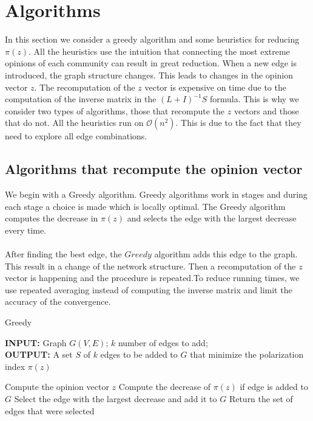 \chapter{Algorithms}
\label{ch:algorithms}


In this section we  consider a greedy algorithm and some heuristics for reducing $\pi(z)$. All the heuristics use the intuition that connecting the most extreme opinions of each community can result in great reduction. 
When a new edge is introduced, the graph structure changes. This leads to changes in the opinion vector $z$.
The recomputation of the $z$ vector is expensive on time due to the computation of the inverse matrix in the $(L+I)^{-1}S$ formula.
This is why we consider two types of algorithms, those that recompute the $z$ vectors and those that do not.
All the heuristics run on $\mathcal{O}(n^2)$. This is due to the fact that they need to explore all edge combinations.

\section{Algorithms that recompute the opinion vector}
\label{sec:recomputeAlgos}

We begin with a Greedy algorithm. Greedy algorithms work in stages and during each stage a choice is made which is locally optimal.
The Greedy algorithm computes the decrease in $\pi(z)$ and selects the edge with the largest decrease every time.
\\
\\
After finding the best edge, the $Greedy$ algorithm adds this edge to the graph. This result in a change of the network structure.
Then a recomputation of the $z$ vector is happening and  the procedure is repeated.To reduce running times, we  use repeated averaging instead of computing the inverse matrix and limit the accuracy of the convergence.

\vspace{30pt}
    		\begin{algorithm}[H]
		
			\caption{Greedy}
			\label{alg:greedyAlgo}
			
			\begin{flushleft}
        				\textbf{INPUT:} Graph $G(V, E)$; $k$ number of edges to add;
				\vspace{6pt} \\
        				\textbf{OUTPUT:} A set $S$ of $k$ edges to be added to $G$ that minimize the polarization \\
				 index $\pi(z)$
			\end{flushleft}
			
			\begin{algorithmic}[1]
				\STATE Compute the opinion vector $z$
						\STATE Compute the decrease of $\pi(z)$ if edge is added to $G$
					\ENDFOR
					\STATE Select the edge with the largest decrease and add it to $G$
				\ENDFOR
				\STATE Return the set of edges that were selected
			\end{algorithmic}
		\end{algorithm}
\vspace{30pt}

